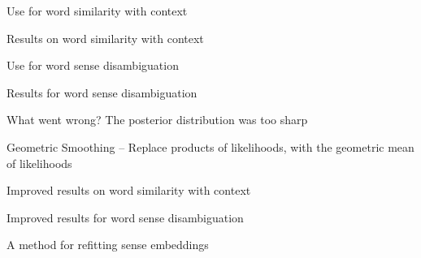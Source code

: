 \documentclass[dvipsnames]{beamer}
\begin{document}
\begin{frame}{Use for word similarity with context}
	
\end{frame}

\begin{frame}{Results on word similarity with context}
	
\end{frame}

\begin{frame}{Use for word sense disambiguation }
	
\end{frame}

\begin{frame}{Results for word sense disambiguation}
	
\end{frame}

\begin{frame}{What went wrong? The posterior distribution was too sharp}
	
\end{frame}

\begin{frame}{Geometric Smoothing -- Replace products of likelihoods, with the geometric mean of likelihoods}
	
\end{frame}


\begin{frame}{Improved results on word similarity with context}
	
\end{frame}


\begin{frame}{Improved results  for word sense disambiguation}
	
\end{frame}


\begin{frame}{A method for refitting sense embeddings}
	
\end{frame}

	
\end{document}
